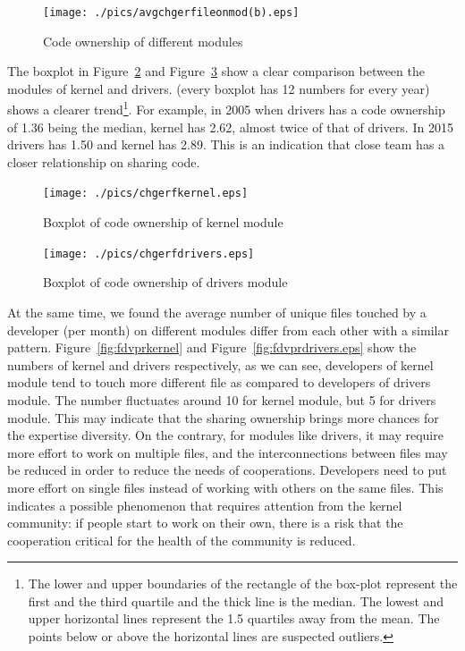 \documentclass{sig-alternate-05-2015}
\begin{document}
\begin{figure}
\centering
\texttt{[image: ./pics/avgchgerfileonmod(b).eps]}
\caption{Code ownership of different modules}
\label{fig:ownership}
\end{figure}

The boxplot in Figure~\ref{fig:ownershipkernel} and Figure~\ref{fig:ownershipdrivers}
show a clear comparison between the modules of kernel and drivers.
(every boxplot has 12 numbers for every year) shows a clearer trend\footnote {The lower and
  upper boundaries of the rectangle of the box-plot represent the
  first and the third quartile and the thick line is the median. The
  lowest and upper horizontal lines represent the 1.5 quartiles away
  from the mean. The points below or above the horizontal lines are
  suspected outliers.}.
For example, in 2005 when drivers has a code ownership of 1.36 being the median, 
kernel has 2.62, almost twice of that of drivers.
In 2015 drivers has 1.50 and kernel has 2.89.
This is an indication that close team has a closer relationship on
sharing code.

\begin{figure}
\centering
\texttt{[image: ./pics/chgerfkernel.eps]} %
\caption{Boxplot of code ownership of kernel module}
\label{fig:ownershipkernel}
\end{figure}

\begin{figure}
\centering
\texttt{[image: ./pics/chgerfdrivers.eps]} %
\caption{Boxplot of code ownership of drivers module}
\label{fig:ownershipdrivers}
\end{figure}

At the same time, we found the average number of unique files touched 
by a developer (per month) on different modules differ from each other
with a similar pattern. Figure~\ref{fig:fdvprkernel} and
Figure~\ref{fig:fdvprdrivers.eps} show the numbers of kernel and drivers
respectively, as we can see, developers of kernel module tend to touch
more different file as compared to developers of drivers module.
The number fluctuates around 10 for kernel module, but 5 for drivers module.
This may indicate that the sharing ownership brings more chances for
the expertise diversity.
On the contrary, for modules like drivers,
 it may require more effort to work on multiple files,
and the interconnections between files may be reduced in order to reduce
the needs of cooperations.
Developers need to put more effort on single files
instead of working with others on the same files.
This indicates a possible phenomenon that requires attention from the kernel community:
if people start to work on their own, there is a risk that the cooperation critical
for the health of the community is reduced.
\end{document}
